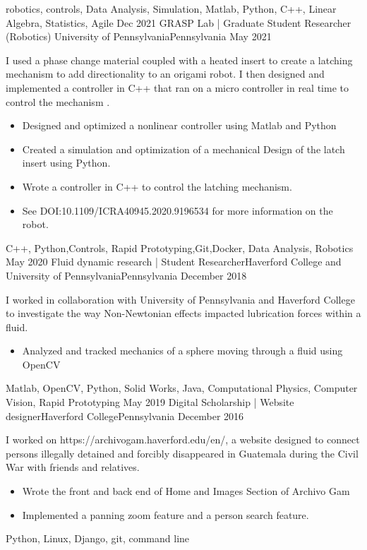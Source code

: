 \begin{experiences}
{\begin{itemize}
 			\end{itemize} 
                 }
                {robotics, controls, Data Analysis, Simulation, Matlab, Python, C++, Linear Algebra, Statistics, Agile}   
 \experience
    {Dec 2021}     {GRASP Lab | Graduate Student Researcher (Robotics)  }{ University of Pennsylvania}{Pennsylvania}
    {May 2021}    {
 I used a phase change material coupled with a heated insert to create a latching mechanism to add directionality to an origami robot. I then designed and implemented a controller in C++ that ran on a micro controller in real time to control the mechanism .
                      \begin{itemize}
			\item Designed and optimized a nonlinear controller using Matlab and Python 
			\item Created a simulation and optimization of a mechanical Design  of the latch insert using Python.
			\item Wrote a controller in C++ to control the latching mechanism.
			\item  See DOI:10.1109/ICRA40945.2020.9196534 for more information on the robot.
                      \end{itemize}
                    }
                    {C++, Python,Controls, Rapid Prototyping,Git,Docker, Data Analysis, Robotics}
  \experience
    {May 2020}   {Fluid dynamic research | Student Researcher}{Haverford College and University of Pennsylvania}{Pennsylvania}
    {December 2018} {
  I worked in collaboration with University of Pennsylvania and Haverford College to investigate the way Non-Newtonian effects impacted lubrication forces within a fluid.
                      \begin{itemize}
                        \item Analyzed and tracked mechanics of a sphere moving through a fluid using OpenCV 
                      \end{itemize}
                    }
                    {Matlab, OpenCV, Python, Solid Works, Java, Computational Physics, Computer Vision, Rapid Prototyping}
  \experience
    {May 2019}   {Digital Scholarship | Website designer}{Haverford College}{Pennsylvania}
    {December 2016} {
    I worked on https://archivogam.haverford.edu/en/, a website designed to connect persons illegally detained and forcibly disappeared in Guatemala during the Civil War with friends and relatives.
                      \begin{itemize}
                       \item Wrote the front and back end of Home and Images Section of Archivo Gam 
		     \item Implemented a panning zoom feature and a person search feature.
                      \end{itemize}
                    }
                    {Python, Linux, Django, git, command line }

 
 

\end{experiences}
